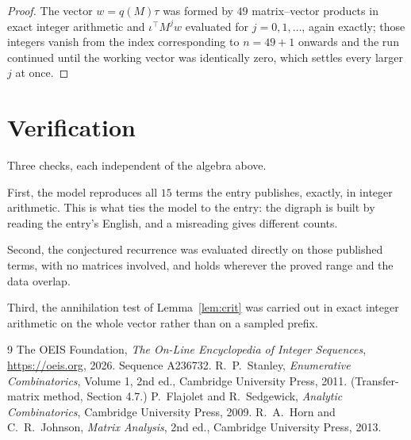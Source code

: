 \documentclass[11pt,a4paper]{article}
\theoremstyle{plain}
\theoremstyle{definition}
\begin{document}
\begin{proof}
The vector $w=q(M)\tau$ was formed by $49$ matrix--vector products in exact integer
arithmetic and $\iota^{\!\top}M^{j}w$ evaluated for $j=0,1,\dots$, again exactly; those
integers vanish from the index corresponding to $n=49+1$ onwards and the run continued
until the working vector was identically zero, which settles every larger $j$ at once.
\end{proof}

\section{Verification}

Three checks, each independent of the algebra above.

First, the model reproduces all $15$ terms the entry publishes, exactly, in integer
arithmetic. This is what ties the model to the entry: the digraph is built by reading the
entry's English, and a misreading gives different counts.

Second, the conjectured recurrence was evaluated directly on those published terms, with no
matrices involved, and holds wherever the proved range and the data overlap.

Third, the annihilation test of Lemma~\ref{lem:crit} was carried out in exact integer
arithmetic on the whole vector rather than on a sampled prefix.

\begin{thebibliography}{9}
 The OEIS Foundation, \emph{The On-Line Encyclopedia of Integer
Sequences}, \url{https://oeis.org}, 2026. Sequence A236732.
 R.~P.~Stanley, \emph{Enumerative Combinatorics}, Volume 1, 2nd ed.,
Cambridge University Press, 2011. (Transfer-matrix method, Section 4.7.)
 P.~Flajolet and R.~Sedgewick, \emph{Analytic Combinatorics}, Cambridge
University Press, 2009.
 R.~A.~Horn and C.~R.~Johnson, \emph{Matrix Analysis}, 2nd ed., Cambridge
University Press, 2013.
\end{thebibliography}
\end{document}
